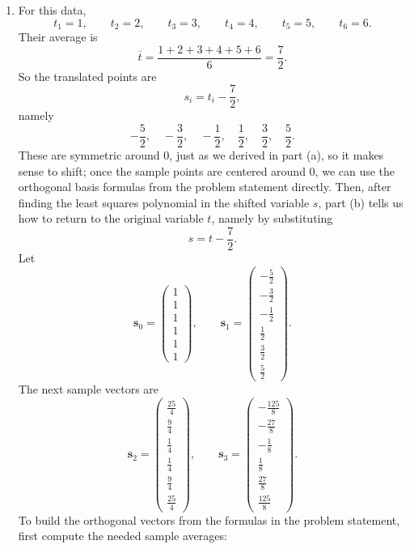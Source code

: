 \documentclass[10pt]{extarticle}
\begin{document}
\begin{enumerate}[label=(\alph*)]
\item For this data,
\[
t_1=1,\qquad t_2=2,\qquad t_3=3,\qquad t_4=4,\qquad t_5=5,\qquad t_6=6.
\]
Their average is
\[
\overline{t}=\frac{1+2+3+4+5+6}{6}=\frac{7}{2}.
\]
So the translated points are
\[
s_i=t_i-\frac{7}{2},
\]
namely
\[
-\frac{5}{2},\quad -\frac{3}{2},\quad -\frac{1}{2},\quad \frac{1}{2},\quad \frac{3}{2},\quad \frac{5}{2}.
\]
These are symmetric around $0$, just as we derived in part (a), so it makes sense to shift; once the sample points are centered around $0$, we can use the orthogonal basis formulas from the problem statement directly. Then, after finding the least squares polynomial in the shifted variable $s$, part (b) tells us how to return to the original variable $t$, namely by substituting
\[
s=t-\frac{7}{2}.
\]
Let
\[
\mathbf{s}_0=
\begin{pmatrix}
1\\1\\1\\1\\1\\1
\end{pmatrix},
\qquad
\mathbf{s}_1=
\begin{pmatrix}
-\frac{5}{2}\\[0.3em]
-\frac{3}{2}\\[0.3em]
-\frac{1}{2}\\[0.3em]
\frac{1}{2}\\[0.3em]
\frac{3}{2}\\[0.3em]
\frac{5}{2}
\end{pmatrix}.
\]
The next sample vectors are
\[
\mathbf{s}_2=
\begin{pmatrix}
\frac{25}{4}\\[0.3em]
\frac{9}{4}\\[0.3em]
\frac{1}{4}\\[0.3em]
\frac{1}{4}\\[0.3em]
\frac{9}{4}\\[0.3em]
\frac{25}{4}
\end{pmatrix},
\qquad
\mathbf{s}_3=
\begin{pmatrix}
-\frac{125}{8}\\[0.3em]
-\frac{27}{8}\\[0.3em]
-\frac{1}{8}\\[0.3em]
\frac{1}{8}\\[0.3em]
\frac{27}{8}\\[0.3em]
\frac{125}{8}
\end{pmatrix}.
\]
To build the orthogonal vectors from the formulas in the problem statement, first compute the needed sample averages:

\end{enumerate}
\end{document}
